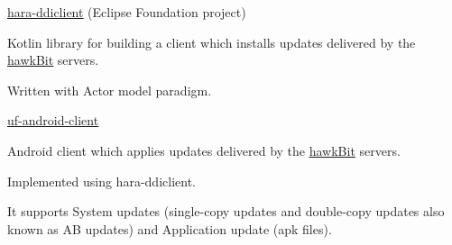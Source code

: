 \newpage
{}


\begin{cventries}

  \cventry
    {\href{https://github.com/eclipse-hara/hara-ddiclient}{\underline{hara-ddiclient}} (Eclipse Foundation project)} %
    {} %
    {} %
    {} %
    {
    \begin{cvitems}
    		\item Kotlin library for building a client which installs updates delivered by the \href{https://eclipse.dev/hawkit/}{\underline{hawkBit}} servers.
    		\item Written with Actor model paradigm.
    \end{cvitems}
    }

  \cventry
    {\href{https://github.com/Kynetics/uf-android-client}{\underline{uf-android-client}}} %
    {} %
    {} %
    {} %
    {
    \begin{cvitems}
      \item Android client which applies updates delivered by the \href{https://eclipse.dev/hawkit/}{\underline{hawkBit}} servers.
    	  \item Implemented using hara-ddiclient.
    	  \item It supports System updates (single-copy updates and double-copy updates also known as AB updates) and Application update (apk files).
    \end{cvitems}
    }

\end{cventries}
